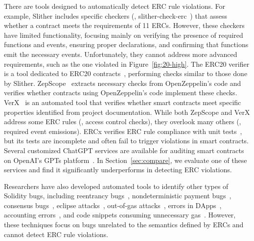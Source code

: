 There are tools designed to automatically detect ERC rule violations. 
For example, Slither includes specific checkers (\ie, slither-check-erc~\cite{slither-erc}) 
that assess whether a contract meets the requirements of 11 ERCs. 
However, these checkers have limited functionality, focusing mainly on 
verifying the presence of required functions and events, 
ensuring proper declarations, and confirming that functions emit 
the necessary events. Unfortunately, they cannot address 
more advanced requirements, such as the one violated in Figure~\ref{fig:20-high}.
%
The ERC20 verifier is a tool dedicated to ERC20 contracts~\cite{erc20-verifier}, 
performing checks similar to those done by Slither. 
ZepScope~\cite{ZepScope} extracts necessary checks from OpenZeppelin's code 
and verifies whether contracts using OpenZeppelin's code implement these checks.
VerX~\cite{VerX} is an automated tool that verifies whether smart contracts meet specific properties identified from project documentation. 
While both ZepScope and VerX address some ERC rules (\eg, access control checks), 
they overlook many others (\eg, required event emissions). 
ERCx verifies ERC rule compliance with unit tests~\cite{ERCx}, but its tests are 
incomplete and often fail to trigger violations in smart contracts. 
Several customized ChatGPT services are available for auditing smart contracts on 
OpenAI's GPTs 
platform~\cite{GPT-RyanHarvey,GPT-MichaelDNorman}. 
In Section~\ref{sec:compare}, we evaluate one of these services 
and find it significantly underperforms in detecting ERC violations.





Researchers have also developed automated tools to identify other types of Solidity bugs, including reentrancy bugs~\cite{liu2018reguard, qian2020towards, xue2020cross, Oyente, Zeus}, nondeterministic payment bugs~\cite{wang2019detecting, li20safepay}, consensus bugs~\cite{yang2021finding, chen2023tyr}, eclipse attacks~\cite{wust2016ethereum, xu2020eclipsed, marcus2018low}, out-of-gas attacks~\cite{grech2018madmax,ghaleb2022etainter}, errors in DApps~\cite{VetSC}, accounting errors~\cite{zhang2024towards},
and code snippets consuming unnecessary gas~\cite{kong.pattern,brandstatter2020characterizing, brand.efficiency,nelaturu2021smart,chen2018towards,gaschecker,chen2017under,slither}. 
However, these techniques focus on bugs unrelated to the 
semantics defined by ERCs and cannot detect ERC rule 
violations. %

